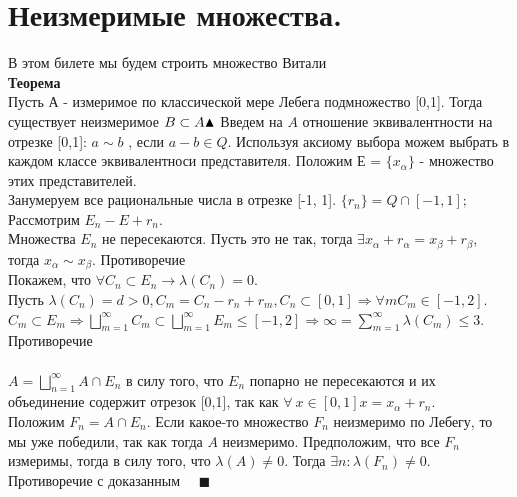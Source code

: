 \section{Неизмеримые множества.}
В этом билете мы будем строить множество Витали
\\
\textbf{Теорема}
\\
Пусть А - измеримое по классической мере Лебега подмножество [0,1]. Тогда существует неизмеримое $B \subset A \\ \blacktriangle$ Введем на $A$ отношение эквивалентности на отрезке [0,1]: $a \sim b$ , если $a-b \in Q$. Используя аксиому выбора можем выбрать в каждом классе эквивалентноси представителя. Положим Е = $\{x_{\alpha}\}$ - множество этих представителей.
\\
Занумеруем все рациональные числа в отрезке [-1, 1]. $\{r_n\} = Q \cap [-1, 1];$ Рассмотрим $E_n - E + r_n$.
\\
Множества $E_n$ не пересекаются. Пусть это не так, тогда $\exists x_{\alpha} + r_{\alpha} = x_{\beta} + r_{\beta}$, тогда $x_{\alpha} \sim x_{\beta}$. Противоречие
\\
Покажем, что $\forall C_n \subset E_n \rightarrow \lambda(C_n) = 0$.
\\
Пусть $\lambda(C_n) = d  > 0, C_m = C_n - r_n + r_m, C_n \subset [0, 1] \Longrightarrow \forall m C_m \in [-1, 2]$. 
\\
$C_m \subset E_m \Longrightarrow \bigsqcup_{m=1}^{\infty}C_m \subset \bigsqcup_{m=1}^{\infty}E_m \leq [-1,2] \Longrightarrow \infty = \sum\limits_{m=1}^{\infty}\lambda(C_m)  \leq 3$. Противоречие
\\
\\
$A = \bigsqcup_{n=1}^{\infty} A\cap E_n$ в силу того, что $E_n$ попарно не пересекаются и их объединение содержит отрезок [0,1], так как $\forall \ x \in [0,1] x = x_{\alpha} + r_n$.
\\
Положим $F_n = A\cap E_n$. Если какое-то множество $F_n$ неизмеримо по Лебегу, то мы уже победили, так как тогда $A$ неизмеримо. Предположим, что все $F_n$ измеримы, тогда в силу того, что $\lambda(A) \neq 0$. Тогда $\exists n: \lambda(F_n) \neq 0$. Противоречие с доказанным \ \ $\blacksquare$

\newpage{}

